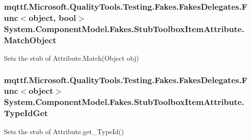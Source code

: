 \hypertarget{class_system_1_1_component_model_1_1_fakes_1_1_stub_toolbox_item_attribute_a1b3b77258bc2acffbf939a5ac0ce6a65}{
\subsubsection[{Match\-Object}]{\setlength{\rightskip}{0pt plus 5cm}mqttf.\-Microsoft.\-Quality\-Tools.\-Testing.\-Fakes.\-Fakes\-Delegates.\-Func$<$object, bool$>$ System.\-Component\-Model.\-Fakes.\-Stub\-Toolbox\-Item\-Attribute.\-Match\-Object}}\label{class_system_1_1_component_model_1_1_fakes_1_1_stub_toolbox_item_attribute_a1b3b77258bc2acffbf939a5ac0ce6a65}


Sets the stub of Attribute.\-Match(\-Object obj)

\hypertarget{class_system_1_1_component_model_1_1_fakes_1_1_stub_toolbox_item_attribute_a2a7c5e7b52d13153c2b56c0bad1d7a7d}{
\subsubsection[{Type\-Id\-Get}]{\setlength{\rightskip}{0pt plus 5cm}mqttf.\-Microsoft.\-Quality\-Tools.\-Testing.\-Fakes.\-Fakes\-Delegates.\-Func$<$object$>$ System.\-Component\-Model.\-Fakes.\-Stub\-Toolbox\-Item\-Attribute.\-Type\-Id\-Get}}\label{class_system_1_1_component_model_1_1_fakes_1_1_stub_toolbox_item_attribute_a2a7c5e7b52d13153c2b56c0bad1d7a7d}


Sets the stub of Attribute.\-get\-\_\-\-Type\-Id()



